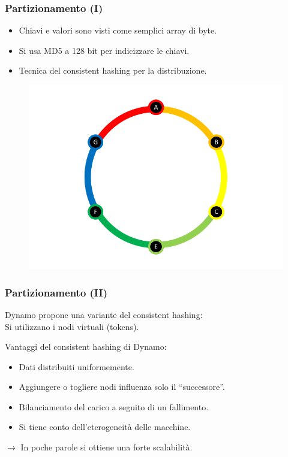 \begin{frame}
  \frametitle{Partizionamento (I)}
  \begin{itemize}
  \item Chiavi e valori sono visti come semplici array di byte.
  \item Si usa MD5 a 128 bit per indicizzare le chiavi.
  \item Tecnica del \alert{consistent hashing} per la distribuzione.
  \end{itemize}
  \begin{figure}
  \centering
  \includegraphics[scale=0.60]{dynamo/consistent-hashing-ring.png}
  \end{figure}
  
\end{frame}


\begin{frame}
  \frametitle{Partizionamento (II)}
  Dynamo propone una variante del consistent hashing: \\
  Si utilizzano i \alert{nodi virtuali} (tokens).
  \begin{block}{Vantaggi del consistent hashing di Dynamo:}
  \begin{itemize}
  \item Dati distribuiti uniformemente.
  \item Aggiungere o togliere nodi influenza solo il ``successore''.
  \item Bilanciamento del carico a seguito di un fallimento.
  \item Si tiene conto dell'eterogeneità delle macchine.
  \end{itemize}
  \end{block}
  $\longrightarrow$ In poche parole si ottiene una forte \alert{scalabilità}.
\end{frame}


